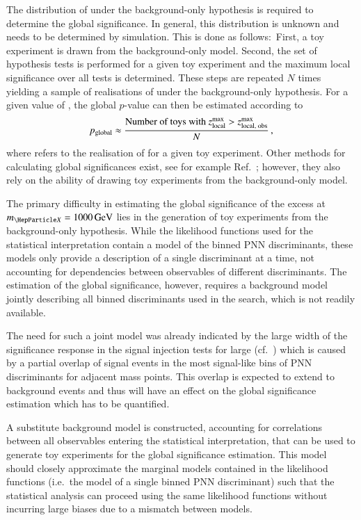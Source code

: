 The distribution of \Zmaxlocal under the background-only hypothesis is required
to determine the global significance. In general, this distribution is unknown
and needs to be determined by simulation. This is done as follows:~First, a toy
experiment is drawn from the background-only model. Second, the set of
hypothesis tests is performed for a given toy experiment and the maximum local
significance over all tests is determined. These steps are repeated $N$ times
yielding a sample of realisations of \Zmaxlocal under the background-only
hypothesis. For a given value of \zmaxlocalobs, the global $p$-value can then be
estimated according to
\begin{align*}
  p_{\text{global}} \approx
  \frac{
  \text{Number of toys with } z_{\text{local}}^{\text{max}} > z_{\text{local, obs}}^{\text{max}}
  }{
  N
  } \,\text{,}
\end{align*}
where \zmaxlocal refers to the realisation of \Zmaxlocal for a given toy
experiment. Other methods for calculating global significances exist, see for
example Ref.~\cite{Gross:2010qma}; however, they also rely on the ability of
drawing toy experiments from the background-only model.



\vspace{10em}

The primary difficulty in estimating the global significance of the excess at
$\mX = \SI{1000}{\GeV}$ lies in the generation of toy experiments from the
background-only hypothesis. While the likelihood functions used for the
statistical interpretation contain a model of the binned PNN discriminants,
these models only provide a description of a single discriminant at a time, not
accounting for dependencies between observables of different discriminants. The
estimation of the global significance, however, requires a background model
jointly describing all binned discriminants used in the search, which is not
readily available.

The need for such a joint model was already indicated by the large width of the
significance response in the signal injection tests for large \mX
(cf.~) which is caused by a partial overlap of
signal events in the most signal-like bins of PNN discriminants for adjacent
mass points. This overlap is expected to extend to background events and thus
will have an effect on the global significance estimation which has to be
quantified.

A substitute background model is constructed, accounting for correlations
between all observables entering the statistical interpretation, that can be
used to generate toy experiments for the global significance estimation. This
model should closely approximate the marginal models contained in the likelihood
functions (i.e.\ the model of a single binned PNN discriminant) such that the
statistical analysis can proceed using the same likelihood functions without
incurring large biases due to a mismatch between models.

